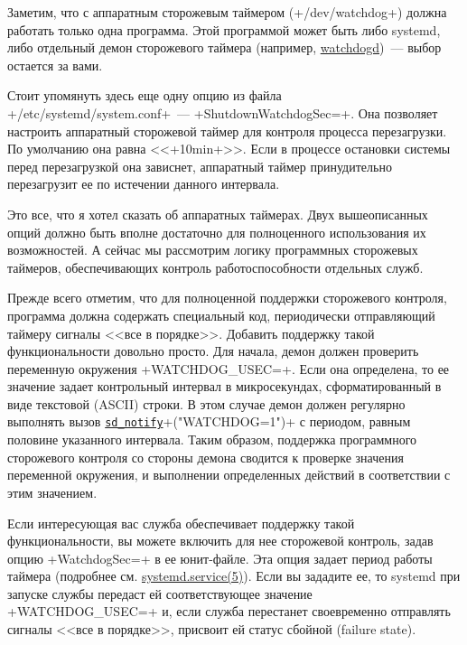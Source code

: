 \documentclass[10pt,oneside,a4paper]{article}
\newcommand{\hreftt}[2]{\href{#1}{\texttt{#2}}}
\begin{document}
Заметим, что с аппаратным сторожевым таймером (+/dev/watchdog+)
должна работать только одна программа. Этой программой может быть либо systemd,
либо отдельный демон сторожевого таймера (например,
\href{http://linux.die.net/man/8/watchdog}{watchdogd})~--- выбор остается за
вами.

Стоит упомянуть здесь еще одну опцию из файла +/etc/systemd/system.conf+~---
+ShutdownWatchdogSec=+. Она позволяет настроить аппаратный сторожевой таймер для
контроля процесса перезагрузки. По умолчанию она равна <<+10min+>>. Если в
процессе остановки системы перед перезагрузкой она зависнет, аппаратный таймер
принудительно перезагрузит ее по истечении данного интервала.

Это все, что я хотел сказать об аппаратных таймерах. Двух вышеописанных опций
должно быть вполне достаточно для полноценного использования их возможностей.
А сейчас мы рассмотрим логику программных сторожевых таймеров, обеспечивающих
контроль работоспособности отдельных служб.

Прежде всего отметим, что для полноценной поддержки сторожевого контроля,
программа должна содержать специальный код, периодически отправляющий таймеру
сигналы <<все в порядке>>. Добавить поддержку такой функциональности довольно
просто. Для начала, демон должен проверить переменную окружения +WATCHDOG_USEC=+.
Если она определена, то ее значение задает контрольный интервал в микросекундах,
сформатированный в виде текстовой (ASCII) строки. В этом случае демон должен
регулярно выполнять вызов
\hreftt{http://www.freedesktop.org/software/systemd/man/sd_notify.html}{sd\_notify}+("WATCHDOG=1")+
с периодом, равным половине указанного интервала. Таким образом, поддержка
программного сторожевого контроля со стороны демона сводится к проверке значения
переменной окружения, и выполнении определенных действий в соответствии с этим
значением.

Если интересующая вас служба обеспечивает поддержку такой 
функциональности, вы можете включить для нее сторожевой контроль, задав опцию
+WatchdogSec=+ в ее юнит-файле. Эта опция задает период работы таймера
(подробнее см.
\href{http://www.freedesktop.org/software/systemd/man/systemd.service.html}{systemd.service(5)}).
Если вы зададите ее, то systemd при запуске службы передаст ей соответствующее
значение +WATCHDOG_USEC=+ и, если служба перестанет своевременно отправлять
сигналы <<все в порядке>>, присвоит ей статус сбойной (failure state).
\end{document}

